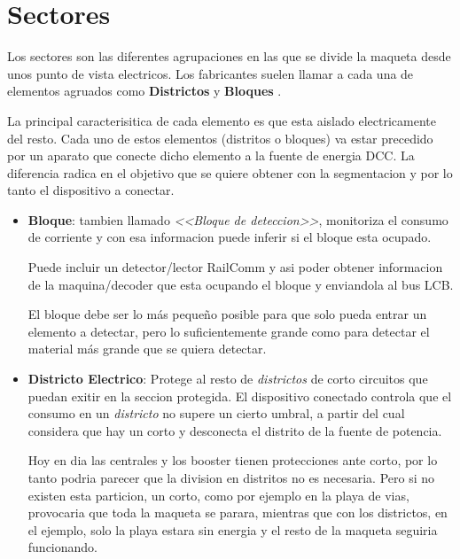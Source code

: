 

\section{Sectores}
Los sectores son las diferentes agrupaciones en las que se divide la maqueta desde unos punto de vista electricos. Los fabricantes suelen llamar a cada una de elementos agruados como \textbf{Districtos} y \textbf{Bloques} .

La principal caracterisitica de cada elemento es que esta aislado electricamente del resto. Cada uno de estos elementos (distritos o bloques) va estar precedido por un aparato que conecte dicho elemento a la fuente de energia DCC. La diferencia radica en el objetivo que se quiere obtener con la segmentacion y por lo tanto el dispositivo a conectar. 

\begin{itemize}
\item \textbf{Bloque}: tambien llamado \textit{<<Bloque de deteccion>>}, monitoriza el consumo de corriente y con esa informacion puede inferir si el bloque esta ocupado. 

Puede incluir un detector/lector RailComm y asi poder obtener informacion de la maquina/decoder que esta ocupando el bloque y enviandola al bus LCB.

El bloque debe ser lo más pequeño posible para que solo pueda entrar un elemento a detectar, pero lo suficientemente grande como para detectar el material más grande que se quiera detectar.

\item \textbf{Districto Electrico}: Protege al resto de \textit{districtos} de corto circuitos que puedan exitir en la seccion protegida. El dispositivo conectado controla que el consumo en un   \textit{districto} no supere un cierto umbral, a partir del cual considera que hay un corto y desconecta el distrito de la fuente de potencia.

Hoy en dia las centrales y los booster tienen protecciones ante corto, por lo tanto podria parecer que la division en distritos no es necesaria. Pero si no existen esta particion, un corto, como por ejemplo en la playa de vias, provocaria que toda la maqueta se parara, mientras que con los districtos, en el ejemplo, solo la playa estara sin energia y el resto de la maqueta seguiria funcionando.
\end{itemize}


